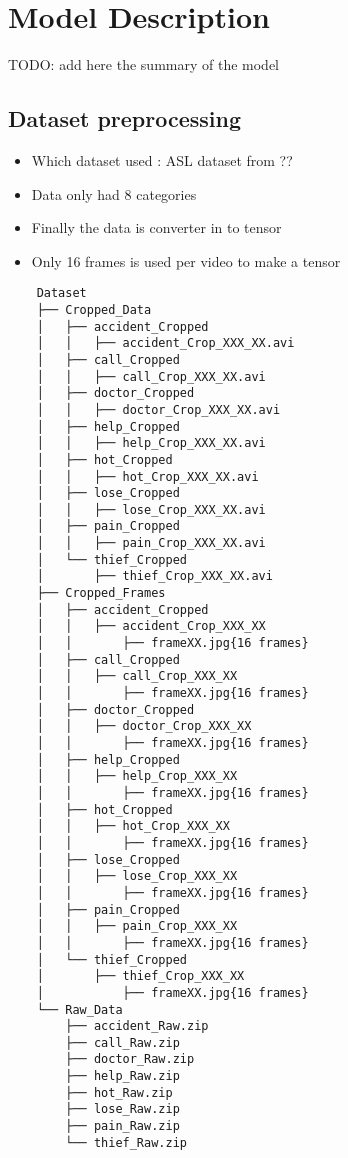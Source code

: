 \documentclass{main}
\begin{document}
\section{Model Description}

TODO: add here the summary of the model 

\subsection{Dataset preprocessing}

\begin{itemize}
	\item Which dataset used : ASL dataset from ??
	\item Data only had 8 categories
	\item Finally the data is converter in to tensor
	\item Only 16 frames is used per video to make a tensor
\end{itemize}

\begin{verbatim}
	Dataset
	├── Cropped_Data
	│   ├── accident_Cropped
	│  	│	├── accident_Crop_XXX_XX.avi
	│   ├── call_Cropped
	│  	│	├── call_Crop_XXX_XX.avi
	│   ├── doctor_Cropped
	│  	│	├── doctor_Crop_XXX_XX.avi
	│   ├── help_Cropped
	│  	│	├── help_Crop_XXX_XX.avi
	│   ├── hot_Cropped
	│  	│	├── hot_Crop_XXX_XX.avi
	│   ├── lose_Cropped
	│  	│	├── lose_Crop_XXX_XX.avi
	│   ├── pain_Cropped
	│  	│	├── pain_Crop_XXX_XX.avi
	│   └── thief_Cropped
	│  	 	├── thief_Crop_XXX_XX.avi
	├── Cropped_Frames
	│   ├── accident_Cropped
	│  	│	├── accident_Crop_XXX_XX
	│  	│	 	├── frameXX.jpg{16 frames}
	│   ├── call_Cropped
	│  	│	├── call_Crop_XXX_XX
	│  	│	 	├── frameXX.jpg{16 frames}
	│   ├── doctor_Cropped
	│  	│	├── doctor_Crop_XXX_XX
	│  	│	 	├── frameXX.jpg{16 frames}
	│   ├── help_Cropped
	│  	│	├── help_Crop_XXX_XX
	│  	│	 	├── frameXX.jpg{16 frames}
	│   ├── hot_Cropped
	│  	│	├── hot_Crop_XXX_XX
	│  	│	 	├── frameXX.jpg{16 frames}
	│   ├── lose_Cropped
	│  	│	├── lose_Crop_XXX_XX
	│  	│	 	├── frameXX.jpg{16 frames}
	│   ├── pain_Cropped
	│  	│	├── pain_Crop_XXX_XX
	│  	│	 	├── frameXX.jpg{16 frames}
	│   └── thief_Cropped
	│  	 	├── thief_Crop_XXX_XX
	│  	 	 	├── frameXX.jpg{16 frames}
	└── Raw_Data
		├── accident_Raw.zip
		├── call_Raw.zip
		├── doctor_Raw.zip
		├── help_Raw.zip
		├── hot_Raw.zip
		├── lose_Raw.zip
		├── pain_Raw.zip
		└── thief_Raw.zip
\end{verbatim}
\end{document}
